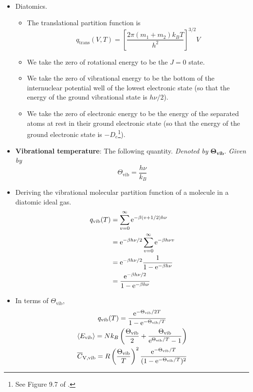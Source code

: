 \documentclass[../notes.tex]{subfiles}
\begin{document}
\begin{itemize}
    \item Diatomics.
    \begin{itemize}
        \item The translational partition function is
        \begin{equation*}
            q_\text{trans}(V,T) = \left[ \frac{2\pi(m_1+m_2)k_BT}{h^2} \right]^{3/2}V
        \end{equation*}
        \item We take the zero of rotational energy to be the $J=0$ state.
        \item We take the zero of vibrational energy to be the bottom of the internuclear potential well of the lowest electronic state (so that the energy of the ground vibrational state is $h\nu/2$).
        \item We take the zero of electronic energy to be the energy of the separated atoms at rest in their ground electronic state (so that the energy of the ground electronic state is $-D_e$\footnote{See Figure 9.7 of \textcite{bib:CHEM26100Notes}.}).
    \end{itemize}
    \item \textbf{Vibrational temperature}: The following quantity. \emph{Denoted by} $\bm{\Theta_\text{vib}}$. \emph{Given by}
    \begin{equation*}
        \Theta_\text{vib} = \frac{h\nu}{k_B}
    \end{equation*}
    \item Deriving the vibrational molecular partition function of a molecule in a diatomic ideal gas.
    \begin{align*}
        q_\text{vib}(T) &= \sum_{v=0}^\infty\e[-\beta(v+1/2)h\nu]\\
        &= \e[-\beta h\nu/2]\sum_{v=0}^\infty\e[-\beta h\nu v]\\
        &= \e[-\beta h\nu/2]\frac{1}{1-\e[-\beta h\nu]}\\
        &= \frac{\e[-\beta h\nu/2]}{1-\e[-\beta h\nu]}
    \end{align*}
    \item In terms of $\Theta_\text{vib}$,
    \begin{gather*}
        q_\text{vib}(T) = \frac{\e[-\Theta_\text{vib}/2T]}{1-\e[-\Theta_\text{vib}/T]}\\
        \prb{E_\text{vib}} = Nk_B\left( \frac{\Theta_\text{vib}}{2}+\frac{\Theta_\text{vib}}{\e[\Theta_\text{vib}/T]-1} \right)\\
        \overline{C}_\text{V,\text{vib}} = R\left( \frac{\Theta_\text{vib}}{T} \right)^2\frac{\e[-\Theta_\text{vib}/T]}{(1-\e[-\Theta_\text{vib}/T])^2}

\end{gather*}
\end{itemize}
\end{document}
